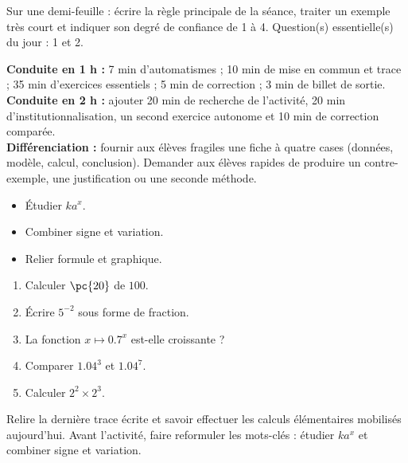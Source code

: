 \begin{exitticket}[3 minutes]Sur une demi-feuille : écrire la règle principale de la séance, traiter un exemple très court et indiquer son degré de confiance de 1 à 4. Question(s) essentielle(s) du jour : 1 et 2.\end{exitticket}

\ifmxteacher
\begin{method}
\textbf{Conduite en 1 h :} 7 min d'automatismes ; 10 min de mise en commun et trace ; 35 min d'exercices essentiels ; 5 min de correction ; 3 min de billet de sortie.\\
\textbf{Conduite en 2 h :} ajouter 20 min de recherche de l'activité, 20 min d'institutionnalisation, un second exercice autonome et 10 min de correction comparée.\\
\textbf{Différenciation :} fournir aux élèves fragiles une fiche à quatre cases (données, modèle, calcul, conclusion). Demander aux élèves rapides de produire un contre-exemple, une justification ou une seconde méthode.
\end{method}
\fi
{}
\begin{objectives}\begin{itemize}\item Étudier $ka^x$.\item Combiner signe et variation.\item Relier formule et graphique.\end{itemize}\end{objectives}
\begin{fluency}\begin{enumerate}\item Calculer $\pc{20}$ de $100$. \item Écrire $5^{-2}$ sous forme de fraction. \item La fonction $x\mapsto\num{0,7}^x$ est-elle croissante ? \item Comparer $\num{1,04}^3$ et $\num{1,04}^7$. \item Calculer $2^2\times2^3$. \end{enumerate}\end{fluency}
\begin{prerequisites}Relire la dernière trace écrite et savoir effectuer les calculs élémentaires mobilisés aujourd'hui. Avant l'activité, faire reformuler les mots-clés : étudier $ka^x$ et combiner signe et variation.\end{prerequisites}

